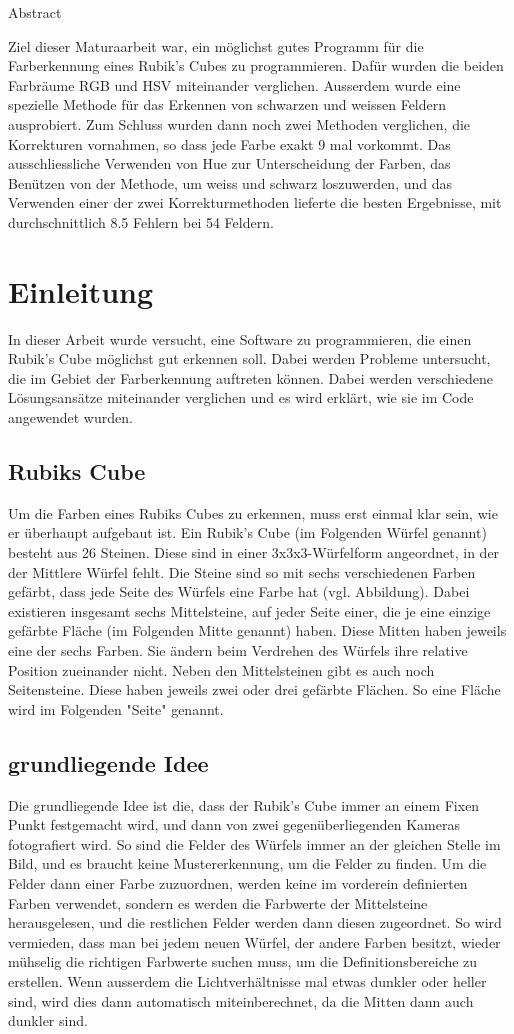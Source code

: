 \documentclass[a4paper, 12pt]{article}
\begin{document}
Abstract

Ziel dieser Maturaarbeit war, ein möglichst gutes Programm für die Farberkennung eines Rubik's Cubes zu programmieren. Dafür wurden die beiden Farbräume RGB und HSV miteinander verglichen. Ausserdem wurde eine spezielle Methode für das Erkennen von schwarzen und weissen Feldern ausprobiert. Zum Schluss wurden dann noch zwei Methoden verglichen, die Korrekturen vornahmen, so dass jede Farbe exakt 9 mal vorkommt. Das ausschliessliche Verwenden von Hue zur Unterscheidung der Farben, das Benützen von der Methode, um weiss und schwarz loszuwerden, und das Verwenden einer der zwei Korrekturmethoden lieferte die besten Ergebnisse, mit durchschnittlich 8.5 Fehlern bei 54 Feldern. 
\tableofcontents
\newpage
\section{Einleitung}
In dieser Arbeit wurde versucht, eine Software zu programmieren, die einen Rubik's Cube möglichst gut erkennen soll. Dabei werden Probleme untersucht, die im Gebiet der Farberkennung auftreten können. Dabei werden verschiedene Lösungsansätze miteinander verglichen und es wird erklärt, wie sie im Code angewendet wurden.
\subsection{Rubiks Cube}
Um die Farben eines Rubiks Cubes zu erkennen, muss erst einmal klar sein, wie er überhaupt aufgebaut ist. Ein Rubik's Cube (im Folgenden Würfel genannt) besteht aus 26 Steinen. Diese sind in einer 3x3x3-Würfelform angeordnet, in der der Mittlere Würfel fehlt. Die Steine sind so mit sechs verschiedenen Farben gefärbt, dass jede Seite des Würfels eine Farbe hat (vgl. Abbildung). Dabei existieren insgesamt sechs Mittelsteine, auf jeder Seite einer, die je eine einzige gefärbte Fläche (im Folgenden Mitte genannt) haben. Diese Mitten haben jeweils eine der sechs Farben. Sie ändern beim Verdrehen des Würfels ihre relative Position zueinander nicht. Neben den Mittelsteinen gibt es auch noch Seitensteine. Diese haben jeweils zwei oder drei gefärbte Flächen. So eine Fläche wird im Folgenden "Seite" genannt. 
\subsection{grundliegende Idee}
Die grundliegende Idee ist die, dass der Rubik's Cube immer an einem Fixen Punkt festgemacht wird, und dann von zwei gegenüberliegenden Kameras fotografiert wird. So sind die Felder des Würfels immer an der gleichen Stelle im Bild, und es braucht keine Mustererkennung, um die Felder zu finden. Um die Felder dann einer Farbe zuzuordnen, werden keine im vorderein definierten Farben verwendet, sondern es werden die Farbwerte der Mittelsteine herausgelesen, und die restlichen Felder werden dann diesen zugeordnet. So wird vermieden, dass man bei jedem neuen Würfel, der andere Farben besitzt, wieder mühselig die richtigen Farbwerte suchen muss, um die Definitionsbereiche zu erstellen. Wenn ausserdem die Lichtverhältnisse  mal etwas dunkler oder heller sind, wird dies dann automatisch miteinberechnet, da die Mitten dann auch dunkler sind. 
\end{document}
